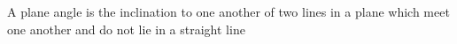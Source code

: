 \documentclass[preview]{standalone}
\begin{document}
\begin{center}
A plane angle is the inclination to one another of two lines in a 
 plane which meet one another and do not lie in a straight line
\end{center}
\end{document}
